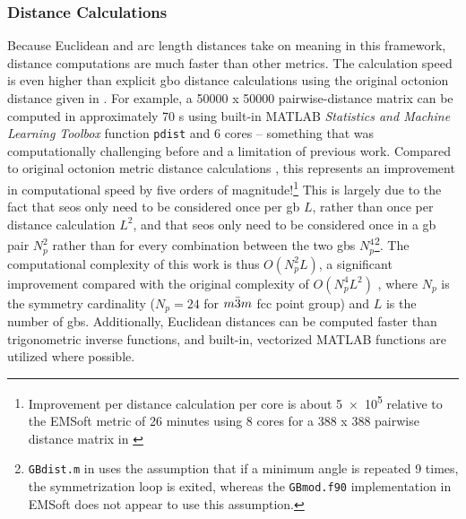 \documentclass[preprint,12pt]{elsarticle}
\begin{document}
\subsubsection{Distance Calculations}
Because Euclidean and arc length distances take on meaning in this framework, distance computations are much faster than other metrics. The calculation speed is even higher than explicit \gls{gbo} distance calculations using the original octonion distance given in \cite{francisGeodesicOctonionMetric2019}. For example, a \num{50000} x \num{50000} pairwise-distance matrix can be computed in approximately 70 s using built-in MATLAB \textit{Statistics and Machine Learning Toolbox} function \texttt{pdist} and 6 cores -- something that was computationally challenging before and a limitation of previous work. Compared to original octonion metric distance calculations \cite{chesserLearningGrainBoundary2020}, this represents an improvement in computational speed by five orders of magnitude!\footnote{Improvement per distance calculation per core is about \num{5e5} relative to the EMSoft \cite{degraefEMSoft2020} metric of 26 minutes using 8 cores for a 388 x 388 pairwise distance matrix in \cite{chesserLearningGrainBoundary2020}} This is largely due to the fact that \glspl{seo} only need to be considered once per \gls{gb} $L$, rather than once per distance calculation $L^2$,
and that \glspl{seo} only need to be considered once in a \gls{gb} pair $N_p^2$ rather than for every combination between the two \glspl{gb} $N_p^4$\footnote{\texttt{GBdist.m} in \cite{chesserGBOctonionCode2019} uses the assumption that if a minimum angle is repeated 9 times, the symmetrization loop is exited, whereas the \texttt{GBmod.f90} implementation in EMSoft \cite{degraefEMSoft2020} does not appear to use this assumption.}. The computational complexity of this work is thus $O(N_p^2L)$, a significant improvement compared with the original complexity of $O(N_p^4L^2)$ \cite{chesserLearningGrainBoundary2020}, where $N_p$ is the symmetry cardinality ($N_p=24$ for $m\Bar{3}m$ \gls{fcc} point group) and $L$ is the number of \glspl{gb}. Additionally, Euclidean distances can be computed faster than trigonometric inverse functions, and built-in, vectorized MATLAB functions are utilized where possible. %
\end{document}
